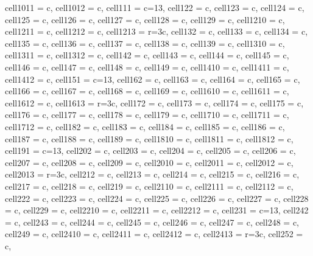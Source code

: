 \begin{table}
{\begin{tblr}
{  cell{10}{11} = {c},
  cell{10}{12} = {c},
  cell{11}{1} = {c=13}{},
  cell{12}{2} = {c},
  cell{12}{3} = {c},
  cell{12}{4} = {c},
  cell{12}{5} = {c},
  cell{12}{6} = {c},
  cell{12}{7} = {c},
  cell{12}{8} = {c},
  cell{12}{9} = {c},
  cell{12}{10} = {c},
  cell{12}{11} = {c},
  cell{12}{12} = {c},
  cell{12}{13} = {r=3}{c},
  cell{13}{2} = {c},
  cell{13}{3} = {c},
  cell{13}{4} = {c},
  cell{13}{5} = {c},
  cell{13}{6} = {c},
  cell{13}{7} = {c},
  cell{13}{8} = {c},
  cell{13}{9} = {c},
  cell{13}{10} = {c},
  cell{13}{11} = {c},
  cell{13}{12} = {c},
  cell{14}{2} = {c},
  cell{14}{3} = {c},
  cell{14}{4} = {c},
  cell{14}{5} = {c},
  cell{14}{6} = {c},
  cell{14}{7} = {c},
  cell{14}{8} = {c},
  cell{14}{9} = {c},
  cell{14}{10} = {c},
  cell{14}{11} = {c},
  cell{14}{12} = {c},
  cell{15}{1} = {c=13}{},
  cell{16}{2} = {c},
  cell{16}{3} = {c},
  cell{16}{4} = {c},
  cell{16}{5} = {c},
  cell{16}{6} = {c},
  cell{16}{7} = {c},
  cell{16}{8} = {c},
  cell{16}{9} = {c},
  cell{16}{10} = {c},
  cell{16}{11} = {c},
  cell{16}{12} = {c},
  cell{16}{13} = {r=3}{c},
  cell{17}{2} = {c},
  cell{17}{3} = {c},
  cell{17}{4} = {c},
  cell{17}{5} = {c},
  cell{17}{6} = {c},
  cell{17}{7} = {c},
  cell{17}{8} = {c},
  cell{17}{9} = {c},
  cell{17}{10} = {c},
  cell{17}{11} = {c},
  cell{17}{12} = {c},
  cell{18}{2} = {c},
  cell{18}{3} = {c},
  cell{18}{4} = {c},
  cell{18}{5} = {c},
  cell{18}{6} = {c},
  cell{18}{7} = {c},
  cell{18}{8} = {c},
  cell{18}{9} = {c},
  cell{18}{10} = {c},
  cell{18}{11} = {c},
  cell{18}{12} = {c},
  cell{19}{1} = {c=13}{},
  cell{20}{2} = {c},
  cell{20}{3} = {c},
  cell{20}{4} = {c},
  cell{20}{5} = {c},
  cell{20}{6} = {c},
  cell{20}{7} = {c},
  cell{20}{8} = {c},
  cell{20}{9} = {c},
  cell{20}{10} = {c},
  cell{20}{11} = {c},
  cell{20}{12} = {c},
  cell{20}{13} = {r=3}{c},
  cell{21}{2} = {c},
  cell{21}{3} = {c},
  cell{21}{4} = {c},
  cell{21}{5} = {c},
  cell{21}{6} = {c},
  cell{21}{7} = {c},
  cell{21}{8} = {c},
  cell{21}{9} = {c},
  cell{21}{10} = {c},
  cell{21}{11} = {c},
  cell{21}{12} = {c},
  cell{22}{2} = {c},
  cell{22}{3} = {c},
  cell{22}{4} = {c},
  cell{22}{5} = {c},
  cell{22}{6} = {c},
  cell{22}{7} = {c},
  cell{22}{8} = {c},
  cell{22}{9} = {c},
  cell{22}{10} = {c},
  cell{22}{11} = {c},
  cell{22}{12} = {c},
  cell{23}{1} = {c=13}{},
  cell{24}{2} = {c},
  cell{24}{3} = {c},
  cell{24}{4} = {c},
  cell{24}{5} = {c},
  cell{24}{6} = {c},
  cell{24}{7} = {c},
  cell{24}{8} = {c},
  cell{24}{9} = {c},
  cell{24}{10} = {c},
  cell{24}{11} = {c},
  cell{24}{12} = {c},
  cell{24}{13} = {r=3}{c},
  cell{25}{2} = {c},
}
\end{tblr}}
\end{table}
